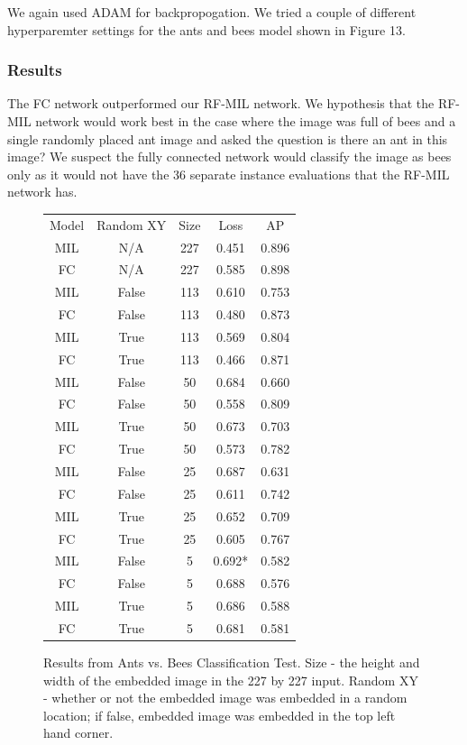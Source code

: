\documentclass[twocolumn,10pt]{article}
\begin{document}
We again used ADAM for backpropogation. We tried a couple of different hyperparemter settings for the ants and bees model shown in Figure 13. 

\subsubsection{Results}

The FC network outperformed our RF-MIL network. We hypothesis that the RF-MIL network would work best in the case where the image was full of bees and a single randomly placed ant image and asked the question is there an ant in this image? We suspect the fully connected network would classify the image as bees only as it would not have the 36 separate instance evaluations that the RF-MIL network has. 
\begin{figure}[H]
  \label{fig:architecture}
  \begin{center}
    \begin{tabular}{ |c|c|c|c|c|}
    \hline
    Model & Random XY & Size & Loss & AP \\\hhline{|=|=|=|=|=|}
MIL  & N/A & 227 & 0.451 & 0.896 \\ \hline
FC & N/A & 227 & 0.585 & 0.898 \\ \hline
MIL & False & 113 & 0.610 & 0.753\\ \hline
FC & False & 113 & 0.480 & 0.873\\ \hline
MIL & True & 113 & 0.569 & 0.804\\ \hline
FC & True &113 &0.466 &0.871\\ \hline
MIL &False &50 &0.684 &0.660\\ \hline
FC &False &50 &0.558 &0.809\\ \hline
MIL &True &50 &0.673 &0.703\\ \hline
FC &True &50 &0.573 &0.782\\ \hline
MIL &False &25 &0.687 &0.631\\ \hline
FC &False &25 &0.611 &0.742\\ \hline
MIL &True &25 &0.652 &0.709\\ \hline
FC &True &25 &0.605 &0.767\\\hline
MIL &False &5 &0.692* &0.582\\\hline
FC &False &5 &0.688 &0.576\\\hline
MIL &True &5 &0.686 &0.588\\\hline
FC &True &5 &0.681 &0.581\\ \hline
    \end{tabular}   
  \end{center}
  \caption{Results from Ants vs. Bees Classification Test. Size - the height and
  width of the embedded image in the 227 by 227 input. Random XY - whether or not
  the embedded image was embedded in a random location; if false, embedded image
  was embedded in the top left hand corner.}
\end{figure}
\end{document}
